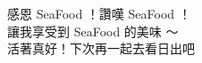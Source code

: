 \renewcommand{\acknowledgementname}{誌\hspace{3em}謝}
\clearpage
{}
\begin{acknowledgements}

感恩 SeaFood ！讚嘆 SeaFood ！\\
讓我享受到 SeaFood 的美味 ～\\
活著真好！下次再一起去看日出吧\\

\end{acknowledgements} 